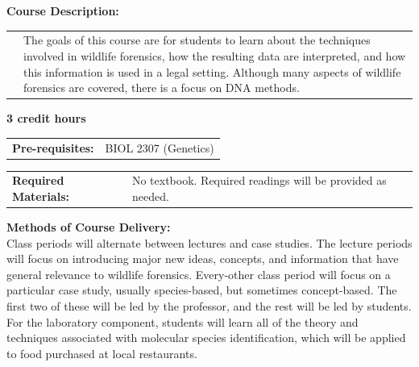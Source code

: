 \documentclass[hidelinks]{article}
\begin{document}
	\textbf{Course Description:}\\
	\begin{tabular}{@{} p{2.3cm} p{13.9cm}}
		 & The goals of this course are for students to learn about the techniques involved in wildlife forensics, how the resulting data are interpreted, and how this information is used in a legal setting. Although many aspects of wildlife forensics are covered, there is a focus on DNA methods.\\
	\end{tabular}

	\textbf{3 credit hours}

	\begin{tabular}{@{} p{2.6cm} l }
		\textbf{Pre-requisites:} & BIOL 2307 (Genetics)
	\end{tabular}

	\begin{tabular}{@{} l l }
		\textbf{Required Materials:} & No textbook. Required readings will be provided as needed.
	\end{tabular}

	\newpage
	\textbf{Methods of Course Delivery:}\\
	Class periods will alternate between lectures and case studies. The lecture periods will focus on introducing major new ideas, concepts, and information that have general relevance to wildlife forensics. Every-other class period will focus on a particular case study, usually species-based, but sometimes concept-based. The first two of these will be led by the professor, and the rest will be led by students. For the laboratory component, students will learn all of the theory and techniques associated with molecular species identification, which will be applied to food purchased at local restaurants.\\
	
\end{document}
